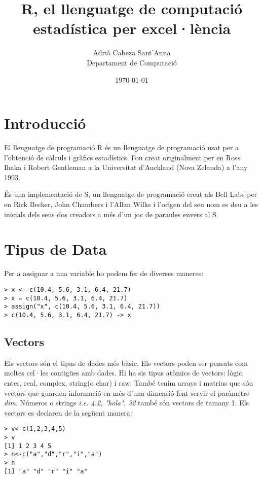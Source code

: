 \documentclass[12pt]{article}
\author{Adrià Cabeza Sant'Anna\\ Departament de Computació}
\title{R, el llenguatge de computació estadística per excel·lència}
\date{\today}
\begin{document}
  \maketitle  

\newpage
\tableofcontents
\newpage

\section{Introducció}
El llenguatge de programació R és un llenguatge de programació usat per a l'obtenció de càlculs i gràfics estadístics. Fou creat originalment per en Ross Ihaka i Robert Gentleman a la Universitat d'Auckland (Nova Zelanda) a l'any 1993.

És una implementació de S, un llenguatge de programació creat als Bell Labs per en Rick Becker, John Chambers i l'Allan Wilks i l'origen del seu nom es deu a les inicials dels seus dos creadors a més d'un joc de paraules envers al S. 

\section{Tipus de Data}
Per a assignar a una variable ho podem fer de diverses maneres:

\begin{verbatim}
> x <- c(10.4, 5.6, 3.1, 6.4, 21.7)
> x = c(10.4, 5.6, 3.1, 6.4, 21.7)
> assign("x", c(10.4, 5.6, 3.1, 6.4, 21.7))
> c(10.4, 5.6, 3.1, 6.4, 21.7) -> x
\end{verbatim}


\subsection{Vectors}
Els vectors són el tipus de dades més bàsic. Els vectors poden ser pensats com moltes cel·les contigües amb dades. Hi ha sis tipus atòmics de vectors: lògic, enter, real, complex, string(o char) i raw. També tenim arrays i matrius que són vectors que guarden informació en més d'una dimensió fent servir el paràmetre \textit{dim}.
Números o strings \textit{i.e. 4.2, "hola", 32} també són vectors de tamany 1.
Els vectors es declaren de la següent manera:
\begin{verbatim}
> v<-c(1,2,3,4,5)
> v
[1] 1 2 3 4 5
> n<-c("a","d","r","i","a")
> n
[1] "a" "d" "r" "i" "a"
\end{verbatim}
\end{document}
